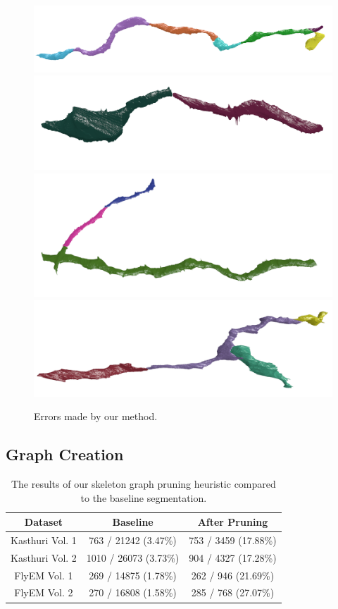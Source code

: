 \begin{figure}[t]
	\centering
	\includegraphics[width=0.85\linewidth]{./figures/multicut-incorrect1.png}
	\includegraphics[width=0.85\linewidth]{./figures/multicut-incorrect2.png}
	\includegraphics[width=0.85\linewidth]{./figures/multicut-incorrect3.png}
	\includegraphics[width=0.85\linewidth]{./figures/multicut-incorrect4.png}
	\caption{Errors made by our method.}
	\label{fig:negative-results}
\end{figure}


\subsection{Graph Creation}

\begin{table}
	\centering
	\small
	\begin{tabular}{c c c} \hline
		\textbf{Dataset} & \textbf{Baseline} & \textbf{After Pruning} \\ \hline
		Kasthuri Vol. 1 & 763 / 21242 (3.47\%) & 753 / 3459 (17.88\%) \\
		Kasthuri Vol. 2 & 1010 / 26073 (3.73\%) & 904 / 4327 (17.28\%) \\
		FlyEM Vol. 1 & 269 / 14875 (1.78\%) & 262 / 946 (21.69\%) \\
		FlyEM Vol. 2 & 270 / 16808 (1.58\%) & 285 / 768 (27.07\%)\\ \hline
	\end{tabular}
	\caption{The results of our skeleton graph pruning heuristic compared to the baseline segmentation.}
	\label{table:skeletonization}
\end{table}

